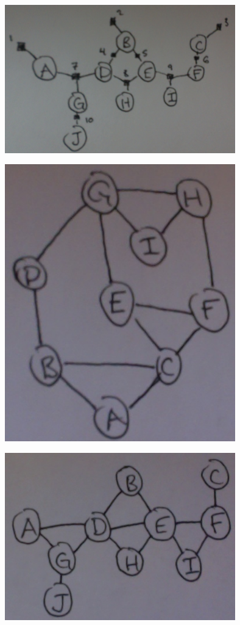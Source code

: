 \documentclass[solution, letterpaper]{cs121}
\begin{document}
\begin{empfile}
\begin{center}
\includegraphics[width=100mm]{factor_graph_b.png}
\end{center}

\subproblem %

\begin{center}
\includegraphics[width=100mm]{undirected_graph_a.png}
\end{center}

\begin{center}
\includegraphics[width=100mm]{undirected_graph_b.png}
\end{center}


\end{empfile}
\end{document}
